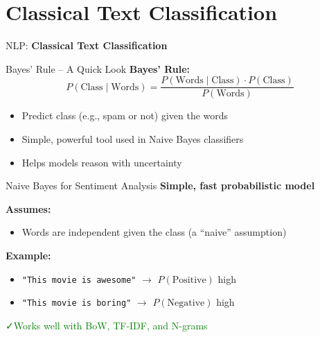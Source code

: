 \section{Classical Text Classification}
\begin{frame}{}
    \LARGE NLP: \textbf{Classical Text Classification}
\end{frame}

\begin{frame}{Bayes' Rule -- A Quick Look}
    \textbf{Bayes' Rule:}
    \[
        P(\text{Class} \mid \text{Words}) = \frac{P(\text{Words} \mid \text{Class}) \cdot P(\text{Class})}{P(\text{Words})}
    \]
    \vspace{1em}
    \begin{itemize}
        \item Predict class (e.g., spam or not) given the words
        \item Simple, powerful tool used in Naive Bayes classifiers
        \item Helps models reason with uncertainty
    \end{itemize}
\end{frame}

\begin{frame}{Naive Bayes for Sentiment Analysis}
    \textbf{Simple, fast probabilistic model}

    \vspace{1em}
    \textbf{Assumes:}
    \begin{itemize}
        \item Words are independent given the class (a ``naive'' assumption)
    \end{itemize}

    \vspace{1em}
    \textbf{Example:}
    \begin{itemize}
        \item \texttt{"This movie is awesome"} $\rightarrow$ $P(\text{Positive})$ high
        \item \texttt{"This movie is boring"} $\rightarrow$ $P(\text{Negative})$ high
    \end{itemize}

    \vspace{1em}
    \textcolor{green}{\faCheck\enspace Works well with BoW, TF-IDF, and N-grams}
\end{frame}

